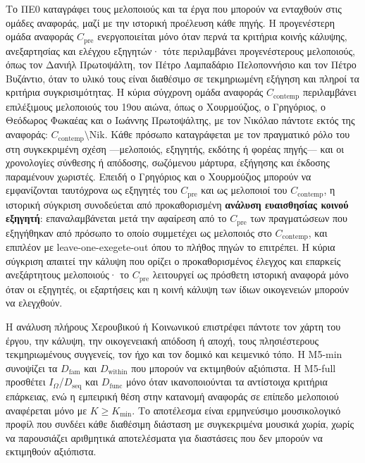 \documentclass[11pt,a4paper]{article}
\begin{document}
Το ΠΕ0 καταγράφει τους μελοποιούς και τα έργα που μπορούν να ενταχθούν στις ομάδες αναφοράς, μαζί με την ιστορική προέλευση κάθε πηγής. Η προγενέστερη ομάδα αναφοράς $C_{\mathrm{pre}}$ ενεργοποιείται μόνο όταν περνά τα κριτήρια κοινής κάλυψης, ανεξαρτησίας και ελέγχου εξηγητών· τότε περιλαμβάνει προγενέστερους μελοποιούς, όπως τον Δανιήλ Πρωτοψάλτη, τον Πέτρο Λαμπαδάριο Πελοποννήσιο και τον Πέτρο Βυζάντιο, όταν το υλικό τους είναι διαθέσιμο σε τεκμηριωμένη εξήγηση και πληροί τα κριτήρια συγκρισιμότητας. Η κύρια σύγχρονη ομάδα αναφοράς $C_{\mathrm{contemp}}$ περιλαμβάνει επιλέξιμους μελοποιούς του 19ου αιώνα, όπως ο Χουρμούζιος, ο Γρηγόριος, ο Θεόδωρος Φωκαέας και ο Ιωάννης Πρωτοψάλτης, με τον Νικόλαο πάντοτε εκτός της αναφοράς: $C_{\mathrm{contemp}}\setminus \mathrm{Nik}$. Κάθε πρόσωπο καταγράφεται με τον πραγματικό ρόλο του στη συγκεκριμένη σχέση ---μελοποιός, εξηγητής, εκδότης ή φορέας πηγής--- και οι χρονολογίες σύνθεσης ή απόδοσης, σωζόμενου μάρτυρα, εξήγησης και έκδοσης παραμένουν χωριστές. Επειδή ο Γρηγόριος και ο Χουρμούζιος μπορούν να εμφανίζονται ταυτόχρονα ως εξηγητές του $C_{\mathrm{pre}}$ και ως μελοποιοί του $C_{\mathrm{contemp}}$, η ιστορική σύγκριση συνοδεύεται από προκαθορισμένη \textbf{ανάλυση ευαισθησίας κοινού εξηγητή}: επαναλαμβάνεται μετά την αφαίρεση από το $C_{\mathrm{pre}}$ των πραγματώσεων που εξηγήθηκαν από πρόσωπο το οποίο συμμετέχει ως μελοποιός στο $C_{\mathrm{contemp}}$, και επιπλέον με leave-one-exegete-out όπου το πλήθος πηγών το επιτρέπει. Η κύρια σύγκριση απαιτεί την κάλυψη που ορίζει ο προκαθορισμένος έλεγχος και επαρκείς ανεξάρτητους μελοποιούς· το $C_{\mathrm{pre}}$ λειτουργεί ως πρόσθετη ιστορική αναφορά μόνο όταν οι εξηγητές, οι εξαρτήσεις και η κοινή κάλυψη των ίδιων οικογενειών μπορούν να ελεγχθούν.

Η ανάλυση πλήρους Χερουβικού ή Κοινωνικού επιστρέφει πάντοτε τον χάρτη του έργου, την κάλυψη, την οικογενειακή απόδοση ή αποχή, τους πλησιέστερους τεκμηριωμένους συγγενείς, τον ήχο και τον δομικό και κειμενικό τόπο. Η M5-min συνοψίζει τα $D_{\mathrm{fam}}$ και $D_{\mathrm{within}}$ που μπορούν να εκτιμηθούν αξιόπιστα. Η M5-full προσθέτει $I_{\Omega}$/$D_{\mathrm{seq}}$ και $D_{\mathrm{func}}$ μόνο όταν ικανοποιούνται τα αντίστοιχα κριτήρια επάρκειας, ενώ η εμπειρική θέση στην κατανομή αναφοράς σε επίπεδο μελοποιού αναφέρεται μόνο με $K\ge K_{\min}$. Το αποτέλεσμα είναι ερμηνεύσιμο μουσικολογικό προφίλ που συνδέει κάθε διαθέσιμη διάσταση με συγκεκριμένα μουσικά χωρία, χωρίς να παρουσιάζει αριθμητικά αποτελέσματα για διαστάσεις που δεν μπορούν να εκτιμηθούν αξιόπιστα.
\end{document}
